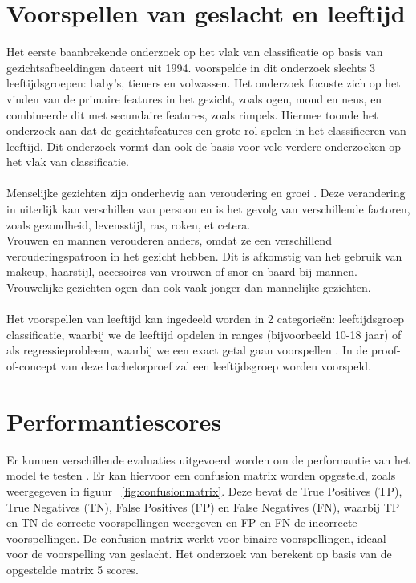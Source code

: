 \section{Voorspellen van geslacht en leeftijd} \label{sec:voorspellen}
Het eerste baanbrekende onderzoek op het vlak van classificatie op basis van gezichtsafbeeldingen dateert uit 1994. \textcite{Kwon1994} voorspelde in dit onderzoek slechts 3 leeftijdsgroepen: baby's, tieners en volwassen. Het onderzoek focuste zich op het vinden van de primaire features in het gezicht, zoals ogen, mond en neus, en combineerde dit met secundaire features, zoals rimpels. Hiermee toonde het onderzoek aan dat de gezichtsfeatures een grote rol spelen in het classificeren van leeftijd. Dit onderzoek vormt dan ook de basis voor vele verdere onderzoeken op het vlak van classificatie.  \\
\\ 
Menselijke gezichten zijn onderhevig aan veroudering en groei \autocite{Gupta2022}. Deze verandering in uiterlijk kan verschillen van persoon en is het gevolg van verschillende factoren, zoals gezondheid, levensstijl, ras, roken, et cetera. \\
Vrouwen en mannen verouderen anders, omdat ze een verschillend verouderingspatroon in het gezicht hebben. Dit is afkomstig van het gebruik van makeup, haarstijl, accesoires van vrouwen of snor en baard bij mannen. Vrouwelijke gezichten ogen dan ook vaak jonger dan mannelijke gezichten. \\
\\
Het voorspellen van leeftijd kan ingedeeld worden in 2 categorieën: leeftijdsgroep classificatie, waarbij we de leeftijd opdelen in ranges (bijvoorbeeld 10-18 jaar) of als regressieprobleem, waarbij we een exact getal gaan voorspellen \autocite{Gupta2022}. In de proof-of-concept van deze bachelorproef zal een leeftijdsgroep worden voorspeld. \\

\section{Performantiescores} \label{sec:performantiescores}
Er kunnen verschillende evaluaties uitgevoerd worden om de performantie van het model te testen \autocite{Sanil2023}. Er kan hiervoor een confusion matrix worden opgesteld, zoals weergegeven in figuur {~\ref{fig:confusionmatrix}}. Deze bevat de True Positives (TP), True Negatives (TN), False Positives (FP) en False Negatives (FN), waarbij TP en TN de correcte voorspellingen weergeven en FP en FN de incorrecte voorspellingen. De confusion matrix werkt voor binaire voorspellingen, ideaal voor de voorspelling van geslacht. Het onderzoek van \textcite{Sanil2023} berekent op basis van de opgestelde matrix 5 scores.
 
